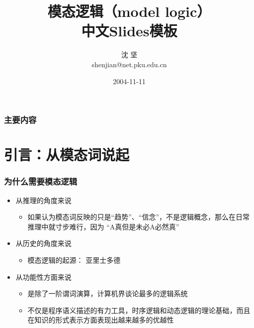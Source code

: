 \documentclass[CJK]{beamer}
\begin{document}


\title[中文Slides模板]
{\huge 模态逻辑（model logic）\\ \normalsize 中文Slides模板}

\author[沈坚]{沈 坚 \\ \small shenjian@net.pku.edu.cn}


\date[]{2004-11-11}

\begin{frame}
 \titlepage
\end{frame}

\begin{frame}
 \frametitle{主要内容}
 \tableofcontents
\end{frame}



\section{引言：从模态词说起}

\begin{frame}
 \frametitle{为什么需要模态逻辑}
 \begin{itemize}
 \item<1-> 从推理的角度来说
   \begin{itemize}
   \item 如果认为模态词反映的只是“趋势”、“信念”，不是逻辑概念，那么在日常推理中就寸步难行，因为 “A真但是未必A必然真”
   \end{itemize}
 \item<2-> 从历史的角度来说
   \begin{itemize}
   \item 模态逻辑的起源：\alert{ \large 亚里士多德}
   \end{itemize}
 \item<3-> 从功能性方面来说
   \begin{itemize}
   \item 是除了一阶谓词演算，计算机界谈论最多的逻辑系统
   \item 不仅是程序语义描述的有力工具，时序逻辑和动态逻辑的理论基础，而且在知识的形式表示方面表现出越来越多的优越性
   \end{itemize}
 \end{itemize}
\end{frame}
\end{document}
